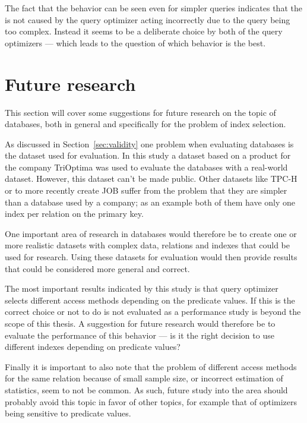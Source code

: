 The fact that the behavior can be seen even for simpler queries indicates that the
is not caused by the query optimizer acting incorrectly due to the query being
too complex. Instead it seems to be a deliberate choice by both of the query
optimizers --- which leads to the question of which behavior is the best.

\section{Future research}
This section will cover some suggestions for future research on the topic of
databases, both in general and specifically for the problem of index selection.

As discussed in Section~\ref{sec:validity} one problem when evaluating
databases is the dataset used for evaluation. In this study a dataset based on a
product for the company TriOptima was used to evaluate the databases with a real-world
dataset. However, this dataset can't be made public. Other datasets like TPC-H
or to more recently create JOB suffer from the problem that they are simpler
than a database used by a company; as an example both of them have only one
index per relation on the primary key.

One important area of research in databases would therefore be to create one or
more realistic datasets with complex data, relations and indexes that could be
used for research. Using these datasets for evaluation would then provide
results that could be considered more general and correct.

The most important results indicated by this study is that query optimizer
selects different access methods depending on the predicate values. If this
is the correct choice or not to do is not evaluated as a performance study is
beyond the scope of this thesis. A suggestion for future research would
therefore be to evaluate the performance of this behavior --- is it the right
decision to use different indexes depending on predicate values?

Finally it is important to also note that the problem of different access
methods for the same relation because of small sample size, or incorrect
estimation of statistics, seem to not be common. As such, future study into the
area should probably avoid this topic in favor of other topics, for example that
of optimizers being sensitive to predicate values.